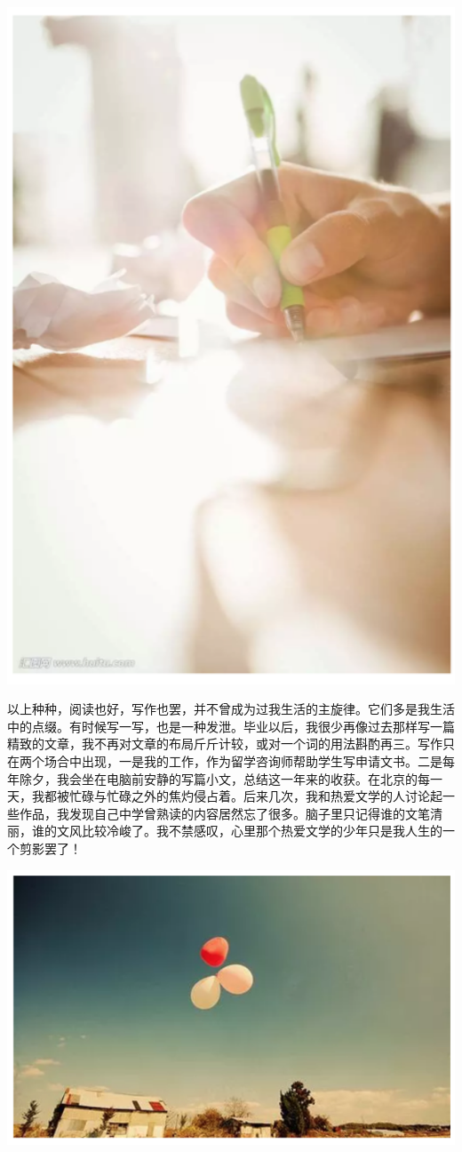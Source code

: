 \documentclass[
]{book}
\begin{document}
\includegraphics[width=5.51in]{images/dream2}

以上种种，阅读也好，写作也罢，并不曾成为过我生活的主旋律。它们多是我生活中的点缀。有时候写一写，也是一种发泄。毕业以后，我很少再像过去那样写一篇精致的文章，我不再对文章的布局斤斤计较，或对一个词的用法斟酌再三。写作只在两个场合中出现，一是我的工作，作为留学咨询师帮助学生写申请文书。二是每年除夕，我会坐在电脑前安静的写篇小文，总结这一年来的收获。在北京的每一天，我都被忙碌与忙碌之外的焦灼侵占着。后来几次，我和热爱文学的人讨论起一些作品，我发现自己中学曾熟读的内容居然忘了很多。脑子里只记得谁的文笔清丽，谁的文风比较冷峻了。我不禁感叹，心里那个热爱文学的少年只是我人生的一个剪影罢了！

\includegraphics[width=8.33in]{images/dream3}
\end{document}
